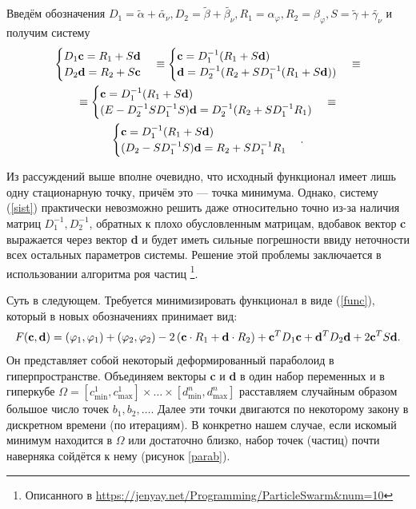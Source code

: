 \documentclass[a4paper]{article}
\begin{document}
Введём обозначения $D_1=\tilde{\alpha}+\tilde{\alpha_{\nu}}, D_2=\tilde{\beta}+\tilde{\beta_{\nu}}, R_1=\alpha_{\varphi}, R_2= \beta_{\varphi}, S=\tilde{\gamma}+\tilde{\gamma_{\nu}}$
и получим систему
\begin{multline}
  \begin{cases}
    D_1 {\bf c}= R_1 + S{\bf d} \\
    D_2 {\bf d}= R_2 + S{\bf c}
  \end{cases}\equiv
  \begin{cases}
    {\bf c}=D_1^{-1} (R_1 + S{\bf d}) \\
    {\bf d}= D_2^{-1}(R_2 + SD_1^{-1} (R_1 + S{\bf d}))
  \end{cases}\equiv\\
  \equiv
  \begin{cases}
    {\bf c}=D_1^{-1} (R_1 + S{\bf d}) \\
    (E-D_2^{-1}SD_1^{-1}S) {\bf d}= D_2^{-1}(R_2 + SD_1^{-1} R_1)
  \end{cases}
  \equiv\\
  \begin{cases}
    {\bf c}=D_1^{-1} (R_1 + S{\bf d}) \\
    (D_2-SD_1^{-1}S) {\bf d}=R_2 + SD_1^{-1} R_1
  \end{cases}.
  \label{sist}
\end{multline}

Из рассуждений выше вполне очевидно, что исходный функционал имеет лишь одну стационарную точку, причём это --- точка минимума.
Однако, систему (\ref{sist}) практически невозможно решить даже относительно точно из-за наличия матриц $D_1^{-1}, D_2^{-1}$, обратных к плохо обусловленным матрицам, вдобавок
вектор {\bf c} выражается через вектор {\bf d} и будет иметь сильные погрешности ввиду неточности всех остальных параметров системы.
Решение этой проблемы заключается в использовании алгоритма роя частиц \footnote{Описанного в \url{https://jenyay.net/Programming/ParticleSwarm&num=10}}.

Суть в следующем. Требуется минимизировать функционал в виде (\ref{func}), который в новых обозначениях принимает вид:
\begin{equation}
  F({\bf c},{\bf d})=(\varphi_1,\varphi_1)+(\varphi_2,\varphi_2)-2\left({\bf c}\cdot R_1+{\bf d}\cdot R_2\right)+
  {\bf c}^T D_1 {\bf c}+{\bf d}^T D_2 {\bf d}+2{\bf c}^T S {\bf d}.
\end{equation}
Он представляет собой некоторый деформированный параболоид в гиперпространстве.
Объединяем векторы {\bf c} и {\bf d} в один набор переменных и в гиперкубе $\Omega=[c^1_{\min},c^1_{\max}] \times \dots \times [d^n_{\min},d^n_{\max}]$
расставляем случайным образом большое число точек $b_1, b_2, \dots$.
Далее эти точки двигаются по некоторому закону в дискретном времени (по итерациям).
В конкретно нашем случае, если искомый минимум находится в $\Omega$ или достаточно близко, набор точек (частиц) почти наверняка сойдётся к нему (рисунок \ref{parab}).
\end{document}
